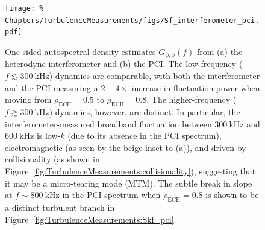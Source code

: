 \begin{figure}
  \centering
  \texttt{[image: \%
    Chapters/TurbulenceMeasurements/figs/Sf\_interferometer\_pci.pdf]}
  \caption[Interferometer \& PCI frequency spectra]{%
    One-sided autospectral-density estimates $G_{\phi,\phi}(f)$ from
    (a) the heterodyne interferometer and (b) the PCI.
    The low-frequency ($f \lesssim \SI{300}{\kilo\hertz}$) dynamics
    are comparable, with both the interferometer and the PCI
    measuring a $2 - 4\times$ increase in fluctuation power
    when moving from $\rho_{\text{ECH}} = 0.5$ to $\rho_{\text{ECH}} = 0.8$.
    The higher-frequency ($f \gtrsim \SI{300}{\kilo\hertz}$) dynamics,
    however, are distinct.
    In particular, the interferometer-measured broadband fluctuation
    between $\SI{300}{\kilo\hertz}$ and $\SI{600}{\kilo\hertz}$
    is low-$k$ (due to its absence in the PCI spectrum),
    electromagnetic (as seen by the beige inset to (a)), and
    driven by collisionality
    (as shown in Figure~\ref{fig:TurbulenceMeasurements:collisionality}),
    suggesting that it may be a micro-tearing mode (MTM).
    The subtle break in slope at $f \sim \SI{800}{\kilo\hertz}$
    in the PCI spectrum when $\rho_{\text{ECH}} = 0.8$
    is shown to be a distinct turbulent branch
    in Figure~\ref{fig:TurbulenceMeasurements:Skf_pci}.
  }
\label{fig:TurbulenceMeasurements:Sf_interferometer_pci}
\end{figure}

